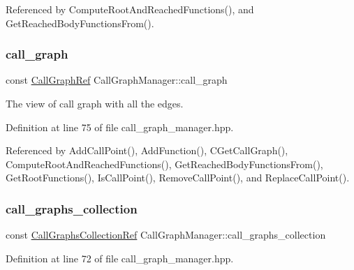 Referenced by Compute\+Root\+And\+Reached\+Functions(), and Get\+Reached\+Body\+Functions\+From().

\mbox{\label{classCallGraphManager_a32789cf408b416672af0758e44efa45c}} 
\subsubsection{\texorpdfstring{call\+\_\+graph}{call\_graph}}
{\footnotesize\ttfamily const \hyperlink{call__graph_8hpp_a58f2b421619a32f5c5bc35e64f3346d3}{Call\+Graph\+Ref} Call\+Graph\+Manager\+::call\+\_\+graph\hspace{0.3cm}{\ttfamily [private]}}



The view of call graph with all the edges. 



Definition at line 75 of file call\+\_\+graph\+\_\+manager.\+hpp.



Referenced by Add\+Call\+Point(), Add\+Function(), C\+Get\+Call\+Graph(), Compute\+Root\+And\+Reached\+Functions(), Get\+Reached\+Body\+Functions\+From(), Get\+Root\+Functions(), Is\+Call\+Point(), Remove\+Call\+Point(), and Replace\+Call\+Point().

\mbox{\label{classCallGraphManager_a09ff858c02243ff6cec04659e65d5bb4}} 
\subsubsection{\texorpdfstring{call\+\_\+graphs\+\_\+collection}{call\_graphs\_collection}}
{\footnotesize\ttfamily const \hyperlink{call__graph_8hpp_afccdc7a00d60cb4ee70f44b223f858bb}{Call\+Graphs\+Collection\+Ref} Call\+Graph\+Manager\+::call\+\_\+graphs\+\_\+collection\hspace{0.3cm}{\ttfamily [private]}}



Definition at line 72 of file call\+\_\+graph\+\_\+manager.\+hpp.



